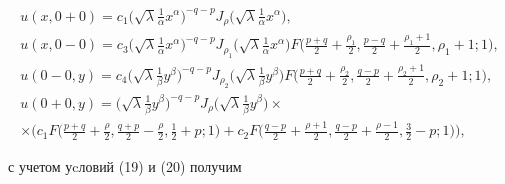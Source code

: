 \begin{gather*} 


u(x,0 + 0)= c_1\bigg(\sqrt{\lambda}\frac{1}{\alpha} 


x^\alpha\bigg)^{-q-p}J_{\rho}\bigg( 


\sqrt{\lambda}\frac{1}{\alpha}x^\alpha\bigg),\\ 


% 


u(x,0 - 0) = c_3\bigg(\sqrt{\lambda} 


\frac{1}{\alpha}x^\alpha\bigg)^{-q - p} J_{\rho_1} 


\bigg(\sqrt{\lambda} \frac{1}{\alpha} x^\alpha\bigg) F\bigg(\frac{p+ 


q}{2} + \frac{\rho_1}{2},\frac{p - q}{2} + 


\frac{\rho_1 + 1}{2}, \rho_1 + 1; 1\bigg),\\ 


% 


u(0-0,y) = c_4\bigg(\sqrt{\lambda} 


\frac{1}{\beta}y^\beta\bigg)^{-q - p} J_{\rho_2} 


\bigg(\sqrt{\lambda} \frac{1}{\beta} y^\beta\bigg) F\bigg(\frac{p+ q}{2} 


+ \frac{\rho_2}{2},\frac{q - p}{2} + 


\frac{\rho_2 + 1}{2}, \rho_2 + 1; 1\bigg),\\ 


% 


u(0+0,y) = \bigg(\sqrt{\lambda} 


\frac{1}{\beta}y^\beta\bigg)^{-q - p} J_{\rho} 


\bigg(\sqrt{\lambda} \frac{1}{\beta} y^\beta\bigg)\times\\ 


% 


\times\bigg( c_1 F\bigg( 


\frac{p+ q}{2} + \frac{\rho}{2},\frac{q + p}{2} - 


\frac{\rho}{2}, \frac{1}{2} + p; 1\bigg) + 


c_2 F\bigg(\frac{q - p}{2} + \frac{\rho +1}{2},\frac{q - p}{2} + 


\frac{\rho - 1}{2}, \frac{3}{2} - p; 1\bigg)\bigg), 


\end{gather*} 


с учетом уcловий (19) и (20) получим 


